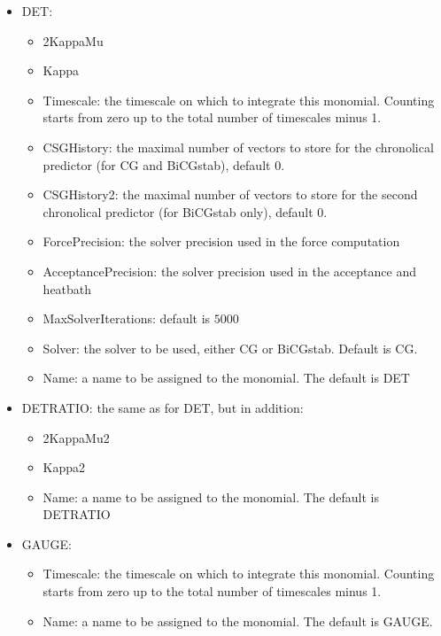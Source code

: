 \begin{itemize}
\item {\ttfamily DET}:
  \begin{itemize}
  \item {\ttfamily 2KappaMu}
  \item {\ttfamily Kappa}
  \item {\ttfamily Timescale}: the timescale on which to integrate
    this monomial. Counting starts from zero up to the total number of
    timescales minus 1.
  \item {\ttfamily CSGHistory}: the maximal number of vectors to store
    for the chronolical predictor (for CG and BiCGstab), default $0$.
  \item {\ttfamily CSGHistory2}: the maximal number of vectors to store
    for the second chronolical predictor (for BiCGstab only), default
    $0$.
  \item {\ttfamily ForcePrecision}: the solver precision used in the
    force computation
  \item {\ttfamily AcceptancePrecision}: the solver precision used in the
    acceptance and heatbath
  \item {\ttfamily MaxSolverIterations}: default is $5000$
  \item {\ttfamily Solver}: the solver to be used, either CG or
    BiCGstab. Default is CG.
  \item {\ttfamily Name}: a name to be assigned to the monomial. The
    default is {\ttfamily DET}
  \end{itemize}
\item {\ttfamily DETRATIO}: the same as for {\ttfamily DET}, but in
  addition:
  \begin{itemize}
  \item {\ttfamily 2KappaMu2}
  \item {\ttfamily Kappa2}
  \item {\ttfamily Name}: a name to be assigned to the monomial. The
    default is {\ttfamily DETRATIO}
  \end{itemize}


\item {\ttfamily GAUGE}: 
  \begin{itemize}
  \item {\ttfamily Timescale}: the timescale on which to integrate
    this monomial. Counting starts from zero up to the total number of
    timescales minus 1.
  \item {\ttfamily Name}: a name to be assigned to the monomial. The
    default is {\ttfamily GAUGE}.


\end{itemize}
\end{itemize}
